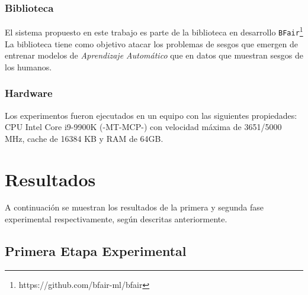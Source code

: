 
\subsubsection{Biblioteca}

El sistema propuesto en este trabajo es parte de la biblioteca en desarrollo \texttt{BFair}\footnote{https://github.com/bfair-ml/bfair}
La biblioteca tiene como objetivo atacar los problemas de sesgos que emergen de entrenar modelos de \emph{Aprendizaje Automático} que en datos que muestran sesgos de los humanos.

\subsubsection{Hardware}

Los experimentos fueron ejecutados en un equipo con las siguientes propiedades:
CPU Intel Core i9-9900K (-MT-MCP-) con velocidad máxima de 3651/5000 MHz, cache de 16384 KB y RAM de 64GB.

\section{Resultados}

A continuación se muestran los resultados de la primera y segunda fase experimental respectivamente, según descritas anteriormente.

\subsection*{Primera Etapa Experimental}